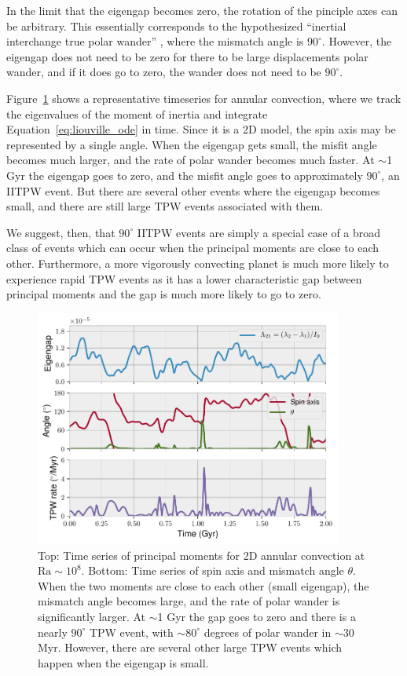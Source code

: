 \documentclass[extra,mreferee]{gji}
\begin{document}
In the limit that the eigengap becomes zero, the rotation of the pinciple axes can be arbitrary. 
This essentially corresponds to the hypothesized ``inertial interchange true polar wander'' \citep{kirschvink1997evidence}, where 
the mismatch angle is $90^\circ$. However, the eigengap does not need to be zero for there to be large displacements polar wander, 
and if it does go to zero, the wander does not need to be $90^\circ$.

Figure~\ref{fig:misfit} shows a representative timeseries for annular convection, where 
we track the eigenvalues of the moment of inertia and integrate Equation~\eqref{eq:liouville_ode} in time.
Since it is a 2D model, the spin axis may be represented by a single angle.
When the eigengap gets small, the misfit angle becomes much larger, and the rate of polar wander becomes much faster.
At $\sim$1 Gyr the eigengap goes to zero, and the misfit angle goes to approximately $90^\circ$, 
an IITPW event. But there are several other events where the eigengap becomes small, and there are 
still large TPW events associated with them.

We suggest, then, that $90^\circ$ IITPW events are simply a special case of a broad class of events which can occur
when the principal moments are close to each other.  Furthermore, a more vigorously convecting planet is much more likely to experience rapid TPW events
as it has a lower characteristic gap between principal moments and the gap is much more likely to go to zero.

\begin{figure}
\centering
\includegraphics[width=0.9\textwidth]{figures/misfit.pdf}
\caption{Top: Time series of principal moments for 2D annular convection at $\mathrm{Ra}\sim10^8$.  Bottom: Time series of spin axis and mismatch angle $\theta$.  When the two moments are close to each other (small eigengap), the mismatch angle becomes large, and the rate of polar wander is significantly larger. At $\sim$1 Gyr the gap goes to zero and there is a nearly $90^\circ$ TPW event, with $\sim80^\circ$ degrees of polar wander in $\sim$30 Myr. However, there are several other large TPW events which happen when the eigengap is small.}
\label{fig:misfit}
\end{figure}
\end{document}
